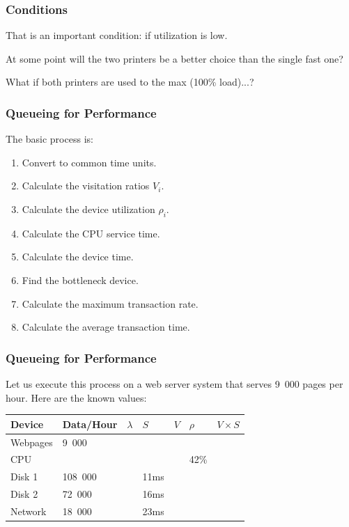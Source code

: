 \begin{frame}
\frametitle{Conditions}

That is an important condition: if utilization is low. 

At some point will the two printers be a better choice than the single fast one? 

What if both printers are used to the max (100\% load)...?

\end{frame}



\begin{frame}
\frametitle{Queueing for Performance}

The basic process is:

\begin{enumerate}
	\item Convert to common time units.
	\item Calculate the visitation ratios $V_{i}$.
	\item Calculate the device utilization $\rho_{i}$.
	\item Calculate the CPU service time.
	\item Calculate the device time.
	\item Find the bottleneck device.
	\item Calculate the maximum transaction rate.
	\item Calculate the average transaction time.
\end{enumerate}

\end{frame}



\begin{frame}
\frametitle{Queueing for Performance}

Let us execute this process on a web server system that serves 9~000 pages per hour. Here are the known values:

\begin{center}
\begin{tabular}{|l|l|l|l|l|l|l|} \hline
	\textbf{Device} & \textbf{Data/Hour} & \textbf{$\lambda$} & \textbf{$S$} & \textbf{$V$} & \textbf{$\rho$} & \textbf{$V \times S$} \\ \hline
	Webpages & 9~000 & & & & & \\ \hline
	CPU & & & & &  42\% & \\ \hline
	Disk 1 & 108~000 & & 11ms & & &\\ \hline
	Disk 2 & 72~000 & & 16ms & & &\\ \hline
	Network & 18~000 & & 23ms & & &\\ \hline
\end{tabular}
\end{center}

\end{frame}



